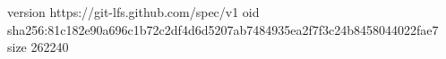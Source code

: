 version https://git-lfs.github.com/spec/v1
oid sha256:81c182e90a696c1b72c2df4d6d5207ab7484935ea2f7f3c24b8458044022fae7
size 262240
